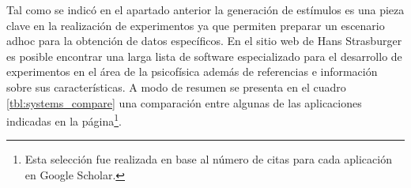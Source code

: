 \documentclass[../main.tex]{subfiles}
\begin{document}
			Tal como se indicó en el apartado anterior la generación de estímulos es una pieza clave en la realización de experimentos ya que permiten preparar un escenario adhoc para la obtención de datos específicos. En el sitio web de Hans Strasburger \cite{website:software} es posible encontrar una larga lista de software especializado para el desarrollo de experimentos en el área de la psicofísica además de referencias e información sobre sus características. A modo de resumen se presenta en el cuadro \ref{tbl:systems_compare} una comparación entre algunas de las aplicaciones indicadas en la página\footnote{Esta selección fue realizada en base al número de citas para cada aplicación en Google Scholar.}.  
			\begin{table}[H]\begin{center}\footnotesize{
				\caption[Comparativa de software de estimulación]{Comparativa de software de estimulación \cite{website:software_presentation, website:software_psychopy, website:software_psychotoolbox, website:software_vissionegg}.}
				\label{tbl:systems_compare}
			}\end{center}\end{table}
\end{document}

